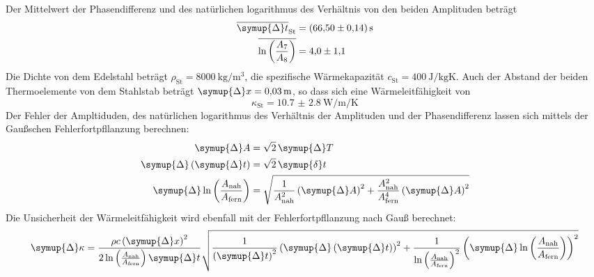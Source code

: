 Der Mittelwert der Phasendifferenz und des natürlichen logarithmus des Verhältnis von den beiden Amplituden beträgt
\begin{align}
  \overline{\symup{\Delta} t}_\text{St}                     & = \SI{66.50(14)}{\second} \\
  \overline{\ln \left (  \frac{A_7}{A_8} \right)} & = \num{4.0(11)}
\end{align}
Die Dichte von dem Edelstahl beträgt $\rho_\text{St} = \SI{8000}{\kilogram\per\cubic\metre}$, die spezifische Wärmekapazität 
$c_\text{St} = \SI{400}{\joule\per\kilogram\kelvin}$. Auch der Abstand der beiden Thermoelemente von dem Stahlstab
beträgt $\symup{\Delta} x = \SI{0.03}{\metre}$, so dass sich eine Wärmeleitfähigkeit von
\begin{equation}
  \kappa_\text{St} = \SI{10.7(28)}{\watt\per\metre\per\kelvin}
\end{equation} 
Der Fehler der Ampltiduden, des natürlichen logarithmus des Verhältnis der Amplituden und der Phasendifferenz 
lassen sich mittels der Gaußschen Fehlerfortpfllanzung berechnen:
\begin{align}
  \symup{\Delta} A                                                      &= \sqrt{2} \, \symup{\Delta} T \\
  \symup{\Delta} \left (\symup{\Delta} t \right )                       &= \sqrt{2} \, \symup{\delta} t \\
  \symup{\Delta} \ln \left ( \frac{A_\text{nah}}{A_\text{fern}} \right) &= 
  \sqrt{\frac{1}{A_\text{nah}^2} \left ( \symup{\Delta} A \right )^2 + 
  \frac{A_\text{nah}^2}{A_\text{fern}^4} \left ( \symup{\Delta} A \right ) ^2} 
\end{align}
Die Unsicherheit der Wärmeleitfähigkeit wird ebenfall mit der Fehlerfortpfllanzung nach Gauß berechnet:
\begin{equation} 
  \symup{\Delta} \kappa = \frac{\rho c \left ( \symup{\Delta} x \right )^2 }
  {2\ln \left ( \frac{A_\text{nah}}{A_\text{fern}} \right ) \symup{\Delta} t} 
  \sqrt{\frac{1}{\left( \symup{\Delta} t\right)^2}
  \left ( \symup{\Delta} \left ( \symup{\Delta} t \right ) \right )^2 + \frac{1}{ \ln \left ( \frac{A_\text{nah}}{A_\text{fern}} \right )^2}
 \left (  \symup{\Delta} \ln \left ( \frac{A_\text{nah}}{A_\text{fern}} \right ) \right )^2}
\end{equation}
